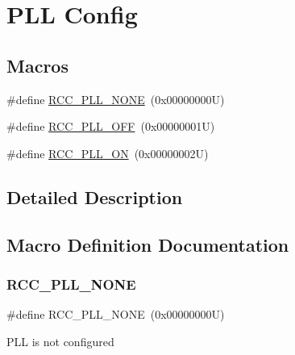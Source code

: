 \hypertarget{group___r_c_c___p_l_l___config}{}\section{P\+LL Config}
\label{group___r_c_c___p_l_l___config}
\subsection*{Macros}
\begin{DoxyCompactItemize}
\item 
\#define \hyperlink{group___r_c_c___p_l_l___config_gae47a612f8e15c32917ee2181362d88f3}{R\+C\+C\+\_\+\+P\+L\+L\+\_\+\+N\+O\+NE}~(0x00000000\+U)
\item 
\#define \hyperlink{group___r_c_c___p_l_l___config_ga3a8d5c8bcb101c6ca1a574729acfa903}{R\+C\+C\+\_\+\+P\+L\+L\+\_\+\+O\+FF}~(0x00000001\+U)
\item 
\#define \hyperlink{group___r_c_c___p_l_l___config_gaf86dbee130304ba5760818f56d34ec91}{R\+C\+C\+\_\+\+P\+L\+L\+\_\+\+ON}~(0x00000002\+U)
\end{DoxyCompactItemize}


\subsection{Detailed Description}


\subsection{Macro Definition Documentation}
\mbox{\label{group___r_c_c___p_l_l___config_gae47a612f8e15c32917ee2181362d88f3}} 
\subsubsection{\texorpdfstring{R\+C\+C\+\_\+\+P\+L\+L\+\_\+\+N\+O\+NE}{RCC\_PLL\_NONE}}
{\footnotesize\ttfamily \#define R\+C\+C\+\_\+\+P\+L\+L\+\_\+\+N\+O\+NE~(0x00000000\+U)}

P\+LL is not configured \mbox{\label{group___r_c_c___p_l_l___config_ga3a8d5c8bcb101c6ca1a574729acfa903}} 
